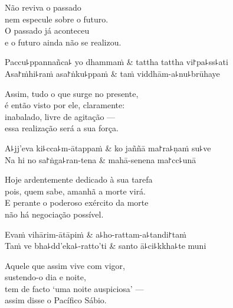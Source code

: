 \begin{english}
  Não reviva o passado\\
  nem especule sobre o futuro.\\
  O passado já aconteceu\\
  e o futuro ainda não se realizou.
\end{english}

\begin{twochants}
  Paccu꜕ppannañca꜕ yo dhammaṁ & tattha tattha vi꜓pa꜕ss꜕ati \\
  Asa꜓ṁhi꜕raṁ asa꜓ṅku꜕ppaṁ & taṁ viddhām-a꜕nu꜕brūhaye \\
\end{twochants}

\begin{english}
  Assim, tudo o que surge no presente,\\
  é então visto por ele, claramente:\\
  inabalado, livre de agitação ---\\
  essa realização será a sua força.
\end{english}

\begin{twochants}
  A꜕jj'eva ki꜕cca꜕m-ātappaṁ & ko jaññā ma꜓ra꜕ṇaṁ su꜕ve \\
  Na hi no sa꜓ṅga꜕ran-tena & mahā-senena ma꜓cc꜕unā \\
\end{twochants}

\begin{english}
  Hoje ardentemente dedicado à sua tarefa\\
  pois, quem sabe, amanhã a morte virá.\\
  E perante o poderoso exército da morte\\
  não há negociação possível.
\end{english}

\clearpage

\begin{twochants}
  Evaṁ vihārim-ātāpiṁ & a꜕ho-rattam-a꜕tandi꜓taṁ \\
  Taṁ ve bha꜕dd'eka꜕-ratto'ti & santo ā꜕ci꜕kkha꜕te muni \\
\end{twochants}

\begin{english}
  Aquele que assim vive com vigor,\\
  sustendo-o dia e noite,\\
  tem de facto `uma noite auspiciosa' ---\\
  assim disse o Pacífico Sábio.
\end{english}

